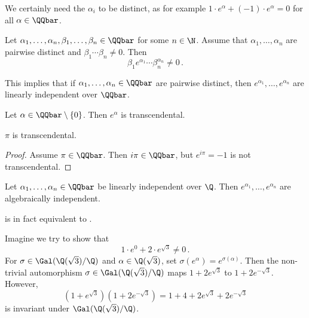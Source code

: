 We certainly need the \( \alpha_i \) to be distinct, as for example \( 1 \cdot e^\alpha + (-1) \cdot e^\alpha = 0 \) for all \( \alpha \in \QQbar \).

\begin{thmn}\label{thm:4.15}
	Let \( \alpha_1, \dotsc, \alpha_n, \beta_1, \dotsc, \beta_n \in \QQbar \) for some \( n \in \N \).
	Assume that \( \alpha_1, \dotsc, \alpha_n \) are pairwise distinct and \( \beta_1 \dotsm \beta_n \neq 0 \).
	Then
	\[ \beta_1 e^{\alpha_1} \dotsm \beta_n^{\alpha_n} \neq 0 \,. \]
\end{thmn}

\begin{rem*}
	This implies that if \( \alpha_1, \dotsc, \alpha_n \in \QQbar \) are pairwise distinct, then \( e^{\alpha_1}, \dotsc, e^{\alpha_n} \) are linearly independent over \( \QQbar \).
\end{rem*}

\begin{cor}
	Let \( \alpha \in \QQbar \setminus \{0\} \).
	Then \( e^\alpha \) is transcendental.
\end{cor}

\begin{cor}
	\( \pi \) is transcendental.
\end{cor}

\begin{proof}
	Assume \( \pi \in \QQbar \).
	Then \( i \pi \in \QQbar \), but \( e^{i\pi} = -1 \) is not transcendental.
\end{proof}

\begin{cor}\label{thm:4.18}
	Let \( \alpha_1, \dotsc, \alpha_n \in \QQbar \) be linearly independent over \( \Q \).
	Then \( e^{\alpha_1}, \dotsc, e^{\alpha_n} \) are algebraically independent.
\end{cor}

\begin{rem*}
	 is in fact equivalent to .
\end{rem*}

\begin{exmp*}
	Imagine we try to show that
	\[ 1 \cdot e^0 + 2 \cdot e^{\sqrt{3}} \neq 0 \,. \]
	For \( \sigma \in \Gal(\Q(\sqrt{3})/\Q) \) and \( \alpha \in \Q(\sqrt{3}) \), set \( \sigma(e^\alpha) = e^{\sigma(\alpha)} \).
	Then the non-trivial automorphism \( \sigma \in \Gal(\Q(\sqrt{3})/\Q) \) maps \( 1+2e^{\sqrt{3}} \) to \( 1+2e^{-\sqrt{3}} \).
	However,
	\[ \left( 1 + e^{\sqrt{3}} \right) \left( 1 + 2e^{-\sqrt{3}} \right) = 1+4 + 2e^{\sqrt{3}} + 2e^{-\sqrt{3}} \]
	is invariant under \( \Gal(\Q(\sqrt{3})/\Q) \).
\end{exmp*}

